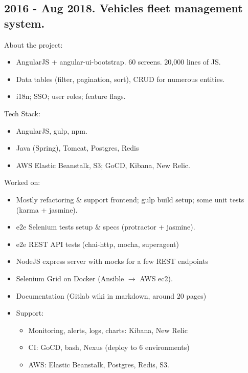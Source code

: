 \documentclass[a4paper, 14pt]{article}
\begin{document}
  \subsection{2016 - Aug 2018. Vehicles fleet management system.}
    About the project:
    \begin{itemize}
      \item AngularJS + angular-ui-bootstrap. 60 screens. 20,000 lines of JS. \\
      \item Data tables (filter, pagination, sort), CRUD for numerous entities. \\
      \item i18n; SSO; user roles; feature flags. \\
    \end{itemize}
    Tech Stack:
    \begin{itemize}
      \item AngularJS, gulp, npm. \\
      \item Java (Spring), Tomcat, Postgres, Redis \\
      \item AWS Elastic Beanstalk, S3; GoCD, Kibana, New Relic. \\
    \end{itemize}
    Worked on: 
    \begin{itemize}
      \item Mostly refactoring \& support frontend; gulp build setup; some unit tests (karma + jasmine). \\
      \item e2e Selenium tests setup \& specs (protractor + jasmine). \\
      \item e2e REST API tests (chai-http, mocha, superagent) \\
      \item NodeJS express server with mocks for a few REST endpoints \\
      \item Selenium Grid on Docker (Ansible $\rightarrow$ AWS ec2). \\
      \item Documentation (Gitlab wiki in markdown, around 20 pages) \\
      \item Support:
        \begin{itemize}
          \item Monitoring, alerts, logs, charts: Kibana, New Relic \\
          \item CI: GoCD, bash, Nexus (deploy to 6 environments) \\
          \item AWS: Elastic Beanstalk, Postgres, Redis, S3. \\
        \end{itemize}
      \end{itemize}
\end{document}
